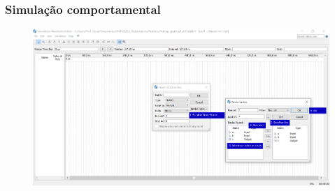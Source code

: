 \documentclass{CPSPresentation}
\begin{document}
\begin{frame}
	\frametitle{Simulação comportamental}
	
	
	\begin{figure}[h]
		\centering
		\includegraphics[width=1.02\textwidth]{quartus/fig19.pdf}
	\end{figure}
	
	
\end{frame}
\end{document}
